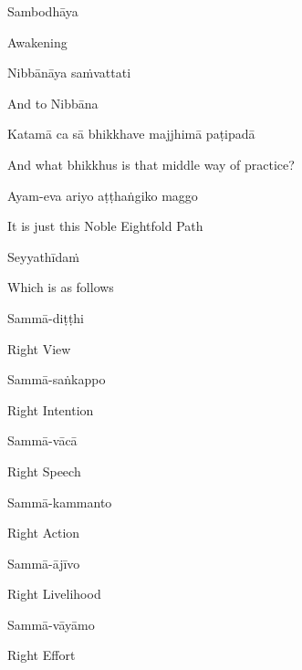 Sambodhāya

\begin{cprenglish}
  Awakening
\end{cprenglish}

Nibbānāya saṁvattati

\begin{cprenglish}
  And to Nibbāna
\end{cprenglish}

Katamā ca sā bhikkhave majjhimā paṭipadā

\begin{cprenglish}
  And what bhikkhus is that middle way of practice?
\end{cprenglish}

Ayam-eva ariyo aṭṭhaṅgiko maggo

\begin{cprenglish}
  It is just this Noble Eightfold Path
\end{cprenglish}

Seyyathīdaṁ

\begin{cprenglish}
  Which is as follows
\end{cprenglish}

Sammā-diṭṭhi

\begin{cprenglish}
  Right View
\end{cprenglish}

Sammā-saṅkappo

\begin{cprenglish}
  Right Intention
\end{cprenglish}

Sammā-vācā

\begin{cprenglish}
  Right Speech
\end{cprenglish}

Sammā-kammanto

\begin{cprenglish}
  Right Action
\end{cprenglish}

Sammā-ājīvo

\begin{cprenglish}
  Right Livelihood
\end{cprenglish}

Sammā-vāyāmo

\begin{cprenglish}
  Right Effort
\end{cprenglish}

